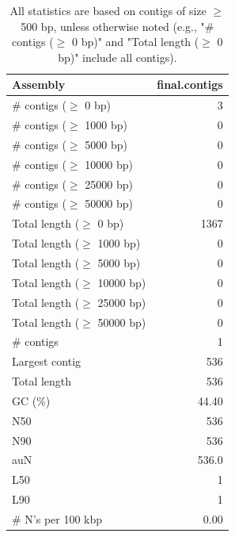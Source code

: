 \documentclass[12pt,a4paper]{article}
\begin{document}
\begin{table}[ht]
\begin{center}
\caption{All statistics are based on contigs of size $\geq$ 500 bp, unless otherwise noted (e.g., "\# contigs ($\geq$ 0 bp)" and "Total length ($\geq$ 0 bp)" include all contigs).}
\begin{tabular}{|l*{1}{|r}|}
\hline
Assembly & final.contigs \\ \hline
\# contigs ($\geq$ 0 bp) & 3 \\ \hline
\# contigs ($\geq$ 1000 bp) & 0 \\ \hline
\# contigs ($\geq$ 5000 bp) & 0 \\ \hline
\# contigs ($\geq$ 10000 bp) & 0 \\ \hline
\# contigs ($\geq$ 25000 bp) & 0 \\ \hline
\# contigs ($\geq$ 50000 bp) & 0 \\ \hline
Total length ($\geq$ 0 bp) & 1367 \\ \hline
Total length ($\geq$ 1000 bp) & 0 \\ \hline
Total length ($\geq$ 5000 bp) & 0 \\ \hline
Total length ($\geq$ 10000 bp) & 0 \\ \hline
Total length ($\geq$ 25000 bp) & 0 \\ \hline
Total length ($\geq$ 50000 bp) & 0 \\ \hline
\# contigs & 1 \\ \hline
Largest contig & 536 \\ \hline
Total length & 536 \\ \hline
GC (\%) & 44.40 \\ \hline
N50 & 536 \\ \hline
N90 & 536 \\ \hline
auN & 536.0 \\ \hline
L50 & 1 \\ \hline
L90 & 1 \\ \hline
\# N's per 100 kbp & 0.00 \\ \hline
\end{tabular}
\end{center}
\end{table}
\end{document}
